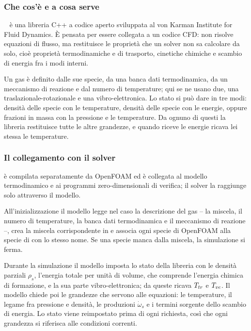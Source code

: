 \subsubsection{Che cos'è e a cosa serve}
\label{sec:mutation-cosa}

\mpp~\cite{scoggins2020} è una libreria C++ a codice aperto sviluppata al von
Karman Institute for Fluid Dynamics. È pensata per essere collegata a un codice
CFD: non risolve equazioni di flusso, ma restituisce le proprietà che un solver
non sa calcolare da solo, cioè proprietà termodinamiche e di trasporto,
cinetiche chimiche e scambio di energia fra i modi interni.

Un gas è definito dalle sue specie, da una banca dati termodinamica, da un
meccanismo di reazione e dal numero di temperature; qui se ne usano due, una
traslazionale-rotazionale e una vibro-elettronica. Lo stato si può dare in tre
modi: densità delle specie con le temperature, densità delle specie con le
energie, oppure frazioni in massa con la pressione e le temperature. Da ognuno
di questi la libreria restituisce tutte le altre grandezze, e quando riceve le
energie ricava lei stessa le temperature.

\subsubsection{Il collegamento con il solver}
\label{sec:mutation-collegamento}

\mpp{} è compilata separatamente da OpenFOAM ed è collegata al modello
termodinamico e ai programmi zero-dimensionali di verifica; il solver la
raggiunge solo attraverso il modello.

All'inizializzazione il modello legge nel caso la descrizione del gas -- la
miscela, il numero di temperature, la banca dati termodinamica e il meccanismo
di reazione --, crea la miscela corrispondente in \mpp{} e associa ogni specie
di OpenFOAM alla specie di \mpp{} con lo stesso nome. Se una specie manca dalla
miscela, la simulazione si ferma.

Durante la simulazione il modello imposta lo stato della libreria con le
densità parziali $\rho_s$, l'energia totale per unità di volume, che comprende
l'energia chimica di formazione, e la sua parte vibro-elettronica; da queste
\mpp{} ricava $T_{tr}$ e $T_{ve}$. Il modello chiede poi le grandezze che servono
alle equazioni: le temperature, il legame fra pressione e densità, le
produzioni $\dot\omega_s$ e i termini sorgente dello scambio di energia. Lo
stato viene reimpostato prima di ogni richiesta, così che ogni grandezza si
riferisca alle condizioni correnti.

